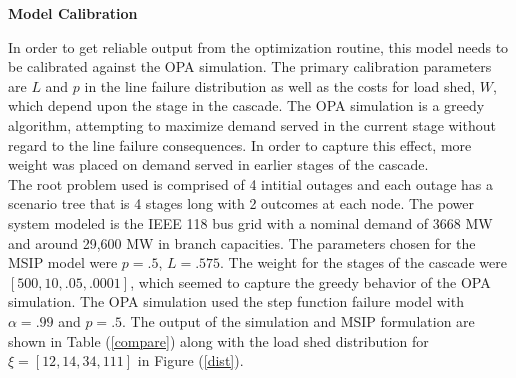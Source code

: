 \textbf{Model Calibration}

In order to get reliable output from the optimization routine, this model needs to be calibrated against the OPA simulation.  The primary calibration parameters are $L$ and $p$ in the line failure distribution as well as the costs for load shed, $W$, which depend upon the stage in the cascade.  The OPA simulation is a greedy algorithm, attempting to maximize demand served in the current stage without regard to the line failure consequences.  In order to capture this effect, more weight was placed on demand served in earlier stages of the cascade. \\

 The root problem used is comprised of 4 intitial outages and each outage has a scenario tree that is 4 stages long with 2 outcomes at each node.  The power system modeled is the IEEE 118 bus grid with a nominal demand of 3668 MW and around 29,600 MW in branch capacities.  The parameters chosen for the MSIP model were $p=.5$, $L =.575$.  The weight for the stages of the cascade were $[500, 10, .05, .0001]$, which seemed to capture the greedy behavior of the OPA simulation.  The OPA simulation used the step function failure model with $\alpha=.99$ and $p=.5$.  The output of the simulation and MSIP formulation are shown in Table (\ref{compare}) along with the load shed distribution for $\xi = [12,14,34,111]$ in Figure (\ref{dist}). 








%



